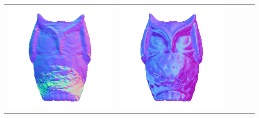 \begin{center}
\begin{tabularx}{\linewidth}{@{}Y@{}Y@{}Y@{}Y@{}Y@{}Y@{}}
\includegraphics[width=\linewidth]{semisynthetic/20150514_15_yu_out.png} &
\includegraphics[width=\linewidth]{semisynthetic/20150514_15_dpsn_out.png} &

\end{tabularx}
\end{center}
